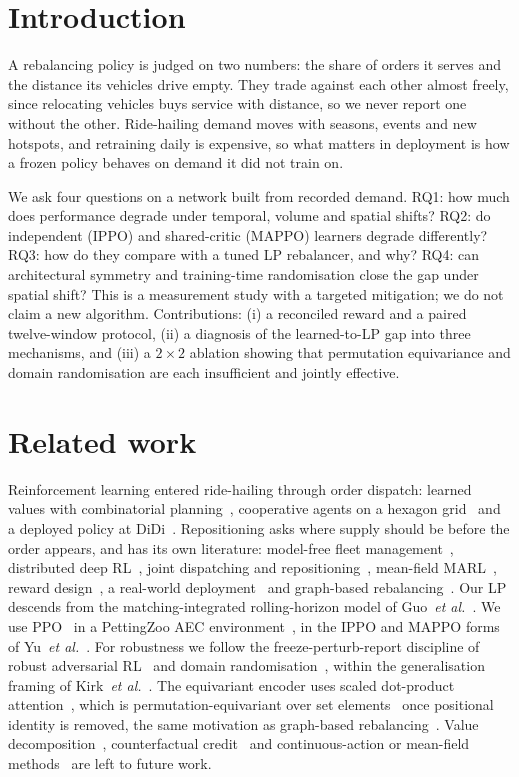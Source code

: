 \documentclass[3p,times,procedia]{elsarticle}
\begin{document}
\section{Introduction}
\label{sec:intro}

A rebalancing policy is judged on two numbers: the share of orders it serves and the distance its vehicles drive empty. They trade against each other almost freely, since relocating vehicles buys service with distance, so we never report one without the other. Ride-hailing demand moves with seasons, events and new hotspots, and retraining daily is expensive, so what matters in deployment is how a frozen policy behaves on demand it did not train on.

We ask four questions on a network built from recorded demand. RQ1: how much does performance degrade under temporal, volume and spatial shifts? RQ2: do independent (IPPO) and shared-critic (MAPPO) learners degrade differently? RQ3: how do they compare with a tuned LP rebalancer, and why? RQ4: can architectural symmetry and training-time randomisation close the gap under spatial shift? This is a measurement study with a targeted mitigation; we do not claim a new algorithm. Contributions: (i) a reconciled reward and a paired twelve-window protocol, (ii) a diagnosis of the learned-to-LP gap into three mechanisms, and (iii) a $2\times2$ ablation showing that permutation equivariance and domain randomisation are each insufficient and jointly effective.

\section{Related work}
\label{sec:related}

Reinforcement learning entered ride-hailing through order dispatch: learned values with combinatorial planning~\cite{xu2018}, cooperative agents on a hexagon grid~\cite{lin2018} and a deployed policy at DiDi~\cite{qin2020}. Repositioning asks where supply should be before the order appears, and has its own literature: model-free fleet management~\cite{oda2018}, distributed deep RL~\cite{alabbasi2019}, joint dispatching and repositioning~\cite{holler2019}, mean-field MARL~\cite{li2019}, reward design~\cite{shou2020}, a real-world deployment~\cite{jiao2021} and graph-based rebalancing~\cite{gammelli2021}. Our LP descends from the matching-integrated rolling-horizon model of Guo~\emph{et al.}~\cite{guo2021}. We use PPO~\cite{schulman2017} in a PettingZoo AEC environment~\cite{pettingzoo}, in the IPPO and MAPPO forms of Yu~\emph{et al.}~\cite{yu2022}. For robustness we follow the freeze-perturb-report discipline of robust adversarial RL~\cite{pinto2017} and domain randomisation~\cite{tobin2017}, within the generalisation framing of Kirk~\emph{et al.}~\cite{kirk2023}. The equivariant encoder uses scaled dot-product attention~\cite{vaswani2017}, which is permutation-equivariant over set elements~\cite{zaheer2017} once positional identity is removed, the same motivation as graph-based rebalancing~\cite{gammelli2021}. Value decomposition~\cite{rashid2018}, counterfactual credit~\cite{foerster2018} and continuous-action or mean-field methods~\cite{lowe2017,yang2018} are left to future work.
\end{document}
